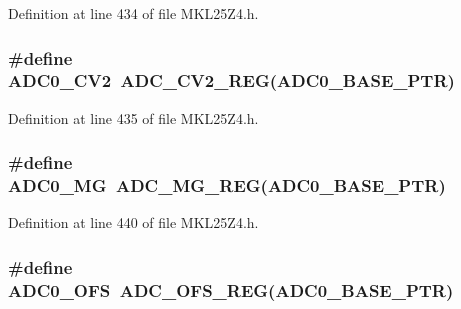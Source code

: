 Definition at line 434 of file M\+K\+L25\+Z4.\+h.

\subsubsection[{\texorpdfstring{A\+D\+C0\+\_\+\+C\+V2}{ADC0_CV2}}]{\setlength{\rightskip}{0pt plus 5cm}\#define A\+D\+C0\+\_\+\+C\+V2~{\bf A\+D\+C\+\_\+\+C\+V2\+\_\+\+R\+EG}({\bf A\+D\+C0\+\_\+\+B\+A\+S\+E\+\_\+\+P\+TR})}\hypertarget{group___a_d_c___register___accessor___macros_ga6625abe45d9bef5adac93e647cd034c3}{}\label{group___a_d_c___register___accessor___macros_ga6625abe45d9bef5adac93e647cd034c3}


Definition at line 435 of file M\+K\+L25\+Z4.\+h.

\subsubsection[{\texorpdfstring{A\+D\+C0\+\_\+\+MG}{ADC0_MG}}]{\setlength{\rightskip}{0pt plus 5cm}\#define A\+D\+C0\+\_\+\+MG~{\bf A\+D\+C\+\_\+\+M\+G\+\_\+\+R\+EG}({\bf A\+D\+C0\+\_\+\+B\+A\+S\+E\+\_\+\+P\+TR})}\hypertarget{group___a_d_c___register___accessor___macros_gac3baf0b5cfa0509588527436dc8bf209}{}\label{group___a_d_c___register___accessor___macros_gac3baf0b5cfa0509588527436dc8bf209}


Definition at line 440 of file M\+K\+L25\+Z4.\+h.

\subsubsection[{\texorpdfstring{A\+D\+C0\+\_\+\+O\+FS}{ADC0_OFS}}]{\setlength{\rightskip}{0pt plus 5cm}\#define A\+D\+C0\+\_\+\+O\+FS~{\bf A\+D\+C\+\_\+\+O\+F\+S\+\_\+\+R\+EG}({\bf A\+D\+C0\+\_\+\+B\+A\+S\+E\+\_\+\+P\+TR})}\hypertarget{group___a_d_c___register___accessor___macros_gafc3e937b7e7ee72630397b81944464b5}{}\label{group___a_d_c___register___accessor___macros_gafc3e937b7e7ee72630397b81944464b5}


